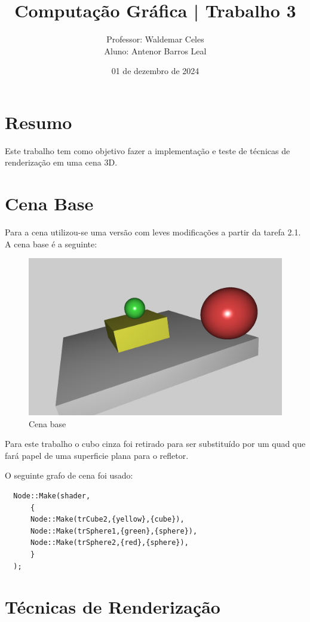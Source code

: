 \documentclass[11pt, a4paper]{article}
\title{Computação Gráfica | Trabalho 3}
\author{Professor: Waldemar Celes\\
Aluno: Antenor Barros Leal}
\date{01 de dezembro de 2024}
\begin{document}
\maketitle

\section {Resumo}
Este trabalho tem como objetivo fazer a implementação e teste de técnicas de renderização
em uma cena 3D.

\section {Cena Base}
Para a cena utilizou-se uma versão com leves modificações a partir da tarefa 2.1. 
A cena base é a seguinte:

\begin{figure}[H]
  \begin{center}
  \includegraphics[width=0.8\linewidth]{base-scene.png}
  \caption{Cena base}
  \label{fig:cena-base}
  \end{center}
\end{figure}

Para este trabalho o cubo cinza foi retirado para ser substituído por um quad 
que fará papel de uma superficie plana para o refletor.

O seguinte grafo de cena foi usado:

\begin{verbatim}
  Node::Make(shader,
      {
      Node::Make(trCube2,{yellow},{cube}),
      Node::Make(trSphere1,{green},{sphere}),
      Node::Make(trSphere2,{red},{sphere}),
      }
  );
\end{verbatim}

\section {Técnicas de Renderização}
\end{document}
